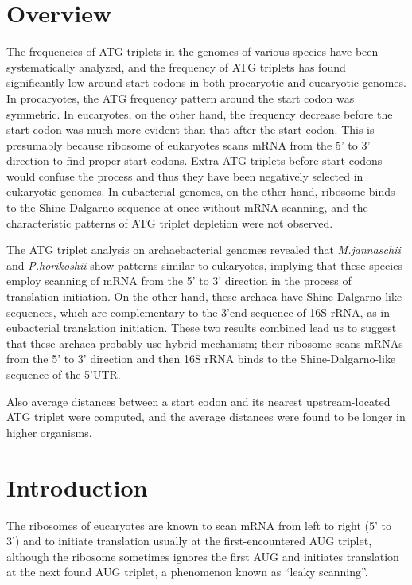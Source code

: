 
\section{Overview}

The frequencies of ATG triplets in the genomes of various species have
been systematically analyzed, and the frequency of ATG triplets has
found significantly low around start codons in both procaryotic and
eucaryotic genomes. In procaryotes, the ATG frequency pattern around
the start codon was symmetric. In eucaryotes, on the other hand, the
frequency decrease before the start codon was much more evident than
that after the start codon.  This is presumably because ribosome of
eukaryotes scans mRNA from the 5' to 3' direction to find proper start
codons. Extra ATG triplets before start codons would confuse the
process and thus they have been negatively selected in eukaryotic
genomes.  In eubacterial genomes, on the other hand, ribosome binds to
the Shine-Dalgarno sequence at once without mRNA scanning, and the
characteristic patterns of ATG triplet depletion were not observed.

The ATG triplet analysis on archaebacterial genomes revealed that {\it
M.jannaschii} and {\it P.horikoshii} show patterns similar to
eukaryotes, implying that these species employ scanning of mRNA from
the 5' to 3' direction in the process of translation initiation.  On
the other hand, these archaea have Shine-Dalgarno-like sequences,
which are complementary to the 3'end sequence of 16S rRNA, as in
eubacterial translation initiation\cite{arclabel_osada}. These two
results combined lead us to suggest that these archaea probably use
hybrid mechanism; their ribosome scans mRNAs from the 5' to 3'
direction and then 16S rRNA binds to the Shine-Dalgarno-like sequence
of the 5'UTR.

Also average distances between a start codon and its nearest
upstream-located ATG triplet were computed, and the average distances
were found to be longer in higher organisms.

\section{Introduction}

The ribosomes of eucaryotes are known to scan mRNA from left to right
(5' to 3') and to initiate translation usually at the
first-encountered AUG triplet\cite{label22,label21,label12}, although
the ribosome sometimes ignores the first AUG and initiates translation
at the next found AUG
triplet\cite{label18,label4,label2,label19,label31,label5}, a
phenomenon known as ``leaky scanning''.

